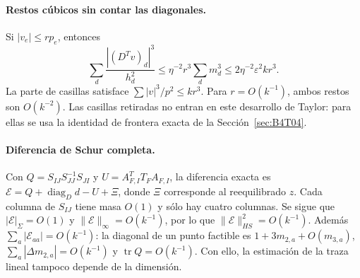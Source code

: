 \paragraph{Restos cúbicos sin contar las diagonales.}
Si $|v_e|\le rp_e$, entonces
\[
 \sum_d\frac{|(D^Tv)_d|^3}{h_d^2}
 \le\eta^{-2}r^3\sum_d m_d^3
 \le2\eta^{-2}\varepsilon^2kr^3.
\]
La parte de casillas satisface $\sum|v|^3/p^2\le kr^3$.
Para $r=O(k^{-1})$, ambos restos son $O(k^{-2})$.
Las casillas retiradas no entran en este desarrollo de Taylor: para ellas se usa la identidad
de frontera exacta de la Sección~\ref{sec:B4T04}.

\paragraph{Diferencia de Schur completa.}
Con $Q=S_{IJ}S_{JJ}^{-1}S_{JI}$ y $U=A_{F,I}^TT_FA_{F,I}$,
la diferencia exacta es $\mathcal E=Q+\operatorname{diag}_D d-U+\Xi$,
donde $\Xi$ corresponde al reequilibrado $z$.
Cada columna de $S_{IJ}$ tiene masa $O(1)$ y sólo hay cuatro columnas.
Se sigue que $|\mathcal E|_\Sigma=O(1)$ y $\|\mathcal E\|_\infty=O(k^{-1})$,
por lo que $\|\mathcal E\|_{HS}^2=O(k^{-1})$.
Además $\sum_a|\mathcal E_{aa}|=O(k^{-1})$:
la diagonal de un punto factible es $1+3m_{2,a}+O(m_{3,a})$,
$\sum_a|\Delta m_{2,a}|=O(k^{-1})$ y $\operatorname{tr}Q=O(k^{-1})$.
Con ello, la estimación de la traza lineal tampoco depende de la dimensión.

